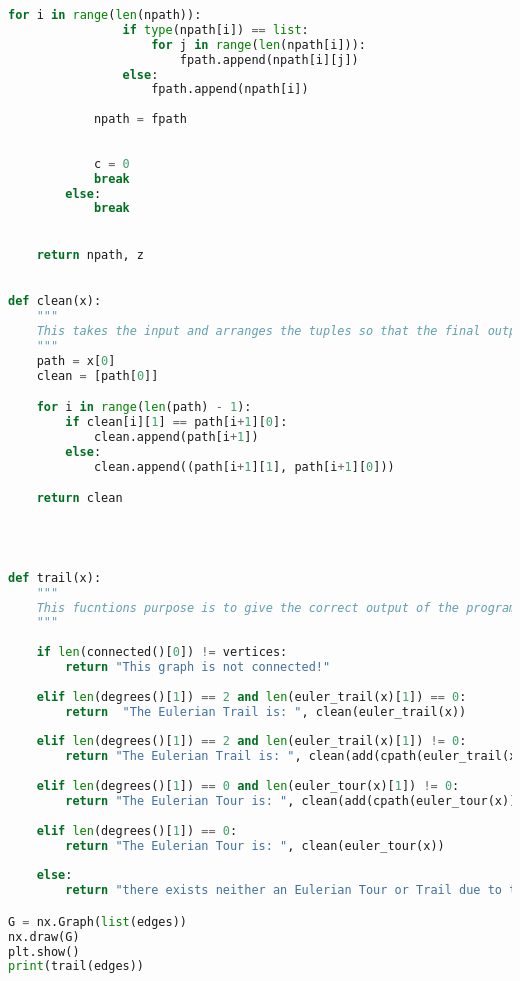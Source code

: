 \documentclass{article}
\begin{document}
\begin{lstlisting}[language=Python]
            for i in range(len(npath)):
                if type(npath[i]) == list:
                    for j in range(len(npath[i])):
                        fpath.append(npath[i][j])
                else:
                    fpath.append(npath[i])
                    
            npath = fpath
                
                
            c = 0
            break
        else:
            break
                    

    return npath, z

    
def clean(x):
    """
    This takes the input and arranges the tuples so that the final output gives a walk to follow (i.e (1,2), (2,3), ...etc).
    """
    path = x[0]
    clean = [path[0]]

    for i in range(len(path) - 1):
        if clean[i][1] == path[i+1][0]:
            clean.append(path[i+1])
        else:
            clean.append((path[i+1][1], path[i+1][0]))

    return clean


    

def trail(x):
    """
    This fucntions purpose is to give the correct output of the program taking into account whether the input is connected and has the correct number of odd degree vertices.
    """
    
    if len(connected()[0]) != vertices:
        return "This graph is not connected!"
    
    elif len(degrees()[1]) == 2 and len(euler_trail(x)[1]) == 0:
        return  "The Eulerian Trail is: ", clean(euler_trail(x))
    
    elif len(degrees()[1]) == 2 and len(euler_trail(x)[1]) != 0:
        return "The Eulerian Trail is: ", clean(add(cpath(euler_trail(x))))
                                                 
    elif len(degrees()[1]) == 0 and len(euler_tour(x)[1]) != 0:
        return "The Eulerian Tour is: ", clean(add(cpath(euler_tour(x))))
                                                 
    elif len(degrees()[1]) == 0:
        return "The Eulerian Tour is: ", clean(euler_tour(x))
                                                 
    else:
        return "there exists neither an Eulerian Tour or Trail due to the number of odd degree vertices."

G = nx.Graph(list(edges))
nx.draw(G)
plt.show()
print(trail(edges))




\end{lstlisting}
\end{document}

